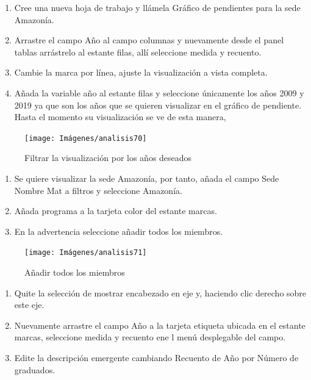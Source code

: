 \documentclass[
]{book}
\begin{document}
\begin{enumerate}
\def\labelenumi{\arabic{enumi}.}
\item
  Cree una nueva hoja de trabajo y llámela Gráfico de pendientes para la sede Amazonía.
\item
  Arrastre el campo Año al campo columnas y nuevamente desde el panel tablas arrástrelo al estante filas, allí seleccione medida y recuento.
\item
  Cambie la marca por línea, ajuste la visualización a vista completa.
\item
  Añada la variable año al estante filas y seleccione únicamente los años 2009 y 2019 ya que son los años que se quieren visualizar en el gráfico de pendiente. Hasta el momento su visualización se ve de esta manera,
\end{enumerate}

\begin{figure}

{\centering \texttt{[image: Imágenes/analisis70]} 

}

\caption{Filtrar la visualización por los años deseados}\label{fig:paso4graficopendiente-fig}
\end{figure}

\begin{enumerate}
\def\labelenumi{\arabic{enumi}.}
\setcounter{enumi}{4}
\item
  Se quiere visualizar la sede Amazonía, por tanto, añada el campo Sede Nombre Mat a filtros y seleccione Amazonía.
\item
  Añada programa a la tarjeta color del estante marcas.
\item
  En la advertencia seleccione añadir todos los miembros.
\end{enumerate}

\begin{figure}

{\centering \texttt{[image: Imágenes/analisis71]} 

}

\caption{Añadir todos los miembros}\label{fig:paso7graficopendiente-fig}
\end{figure}

\begin{enumerate}
\def\labelenumi{\arabic{enumi}.}
\setcounter{enumi}{7}
\item
  Quite la selección de mostrar encabezado en eje y, haciendo clic derecho sobre este eje.
\item
  Nuevamente arrastre el campo Año a la tarjeta etiqueta ubicada en el estante marcas, seleccione medida y recuento ene l menú desplegable del campo.
\item
  Edite la descripción emergente cambiando Recuento de Año por Número de graduados.
\end{enumerate}
\end{document}
